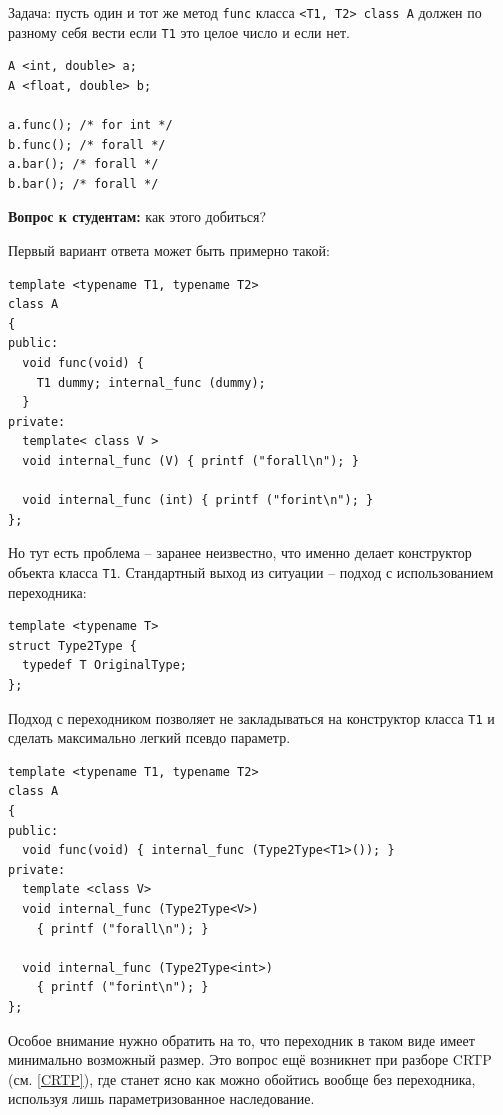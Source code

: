 \documentclass[a4paper,12pt,oneside]{article}
\newif\ifanswers
\begin{document}
Задача: пусть один и тот же метод \lstinline!func! класса \lstinline!<T1, T2> class A! должен по разному себя вести если \lstinline!T1! это целое число и если нет.

\begin{lstlisting}
A <int, double> a;
A <float, double> b;

a.func(); /* for int */
b.func(); /* forall */
a.bar(); /* forall */
b.bar(); /* forall */
\end{lstlisting}

\textbf{Вопрос к студентам:} как этого добиться?

\ifanswers
См. верный ответ ниже (разумеется предполагается немного подумать самому).
\fi

Первый вариант ответа может быть примерно такой:

\begin{lstlisting}
template <typename T1, typename T2>
class A
{
public:
  void func(void) { 
    T1 dummy; internal_func (dummy); 
  }
private:
  template< class V >
  void internal_func (V) { printf ("forall\n"); }

  void internal_func (int) { printf ("forint\n"); }
};
\end{lstlisting}

Но тут есть проблема -- заранее неизвестно, что именно делает конструктор объекта класса \lstinline!T1!. Стандартный выход из ситуации -- подход с использованием переходника: 

\begin{lstlisting}
template <typename T>
struct Type2Type {
  typedef T OriginalType;
};
\end{lstlisting}

Подход с переходником позволяет не закладываться на конструктор класса \lstinline!T1! и сделать максимально легкий псевдо параметр.

\begin{lstlisting}
template <typename T1, typename T2>
class A
{
public:
  void func(void) { internal_func (Type2Type<T1>()); }
private:
  template <class V>
  void internal_func (Type2Type<V>)
    { printf ("forall\n"); }

  void internal_func (Type2Type<int>)
    { printf ("forint\n"); }
};
\end{lstlisting}

Особое внимание нужно обратить на то, что переходник в таком виде имеет минимально возможный размер. Это вопрос ещё возникнет при разборе CRTP (см. \ref{CRTP}), где станет ясно как можно обойтись вообще без переходника, используя лишь параметризованное наследование.
\end{document}
